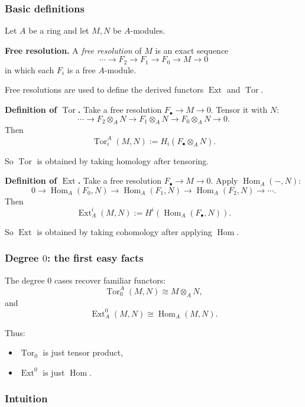 \documentclass[12pt,a4paper]{article}
\theoremstyle{notespace}
\DeclareMathOperator{\Hom}{Hom}
\DeclareMathOperator{\Tor}{Tor}
\DeclareMathOperator{\Ext}{Ext}
\begin{document}
\subsubsection{Basic definitions}

Let \(A\) be a ring and let \(M,N\) be \(A\)-modules.

\textbf{Free resolution.}
A \emph{free resolution} of \(M\) is an exact sequence
\[
\cdots \longrightarrow F_2 \longrightarrow F_1 \longrightarrow F_0 \longrightarrow M \longrightarrow 0
\]
in which each \(F_i\) is a free \(A\)-module.

Free resolutions are used to define the derived functors \(\Ext\) and \(\Tor\).

\medskip

\textbf{Definition of \(\Tor\).}
Take a free resolution \(F_\bullet \to M\to 0\). Tensor it with \(N\):
\[
\cdots \longrightarrow F_2\otimes_A N \longrightarrow F_1\otimes_A N \longrightarrow F_0\otimes_A N \longrightarrow 0.
\]
Then
\[
\Tor_i^A(M,N):=H_i(F_\bullet\otimes_A N).
\]

So \(\Tor\) is obtained by taking homology after tensoring.

\medskip

\textbf{Definition of \(\Ext\).}
Take a free resolution \(F_\bullet \to M\to 0\). Apply \(\Hom_A(-,N)\):
\[
0 \longrightarrow \Hom_A(F_0,N)\longrightarrow \Hom_A(F_1,N)\longrightarrow \Hom_A(F_2,N)\longrightarrow \cdots.
\]
Then
\[
\Ext_A^i(M,N):=H^i(\Hom_A(F_\bullet,N)).
\]

So \(\Ext\) is obtained by taking cohomology after applying \(\Hom\).

\subsubsection{Degree \(0\): the first easy facts}

The degree \(0\) cases recover familiar functors:
\[
\Tor_0^A(M,N)\cong M\otimes_A N,
\]
and
\[
\Ext_A^0(M,N)\cong \Hom_A(M,N).
\]

Thus:
\begin{itemize}
	\item \(\Tor_0\) is just tensor product,
	\item \(\Ext^0\) is just \(\Hom\).
\end{itemize}

\subsubsection{Intuition}
\end{document}
